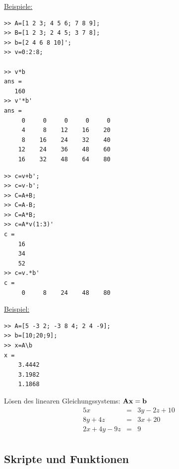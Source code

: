 \underline{Beispiele:}\medskip

\begin{minipage}[t]{0.5\textwidth}
\small\begin{verbatim}
>> A=[1 2 3; 4 5 6; 7 8 9];
>> B=[1 2 3; 2 4 5; 3 7 8];
>> b=[2 4 6 8 10]';
>> v=0:2:8;

>> v*b
ans =
   160
>> v'*b'
ans =
     0     0     0     0     0
     4     8    12    16    20
     8    16    24    32    40
    12    24    36    48    60
    16    32    48    64    80
\end{verbatim}
\end{minipage}
\hfill
\begin{minipage}[t]{0.42\textwidth}
\small\begin{verbatim}
>> c=v+b';
>> c=v-b';
>> C=A+B;
>> C=A-B;
>> C=A*B;
>> c=A*v(1:3)'
c =
    16
    34
    52
>> c=v.*b'
c =
     0     8    24    48    80
\end{verbatim}
\end{minipage}\bigskip

\underline{Beispiel:}\medskip

\begin{minipage}[t]{0.4\textwidth}
\small\begin{verbatim}
>> A=[5 -3 2; -3 8 4; 2 4 -9];
>> b=[10;20;9];
>> x=A\b
x =
    3.4442
    3.1982
    1.1868
\end{verbatim}
\end{minipage}
\hfill
\begin{minipage}[t]{0.59\textwidth}
Lösen des linearen Gleichungssystems: ${{\bm{\mathrm{A}}}}{{\bm{\mathrm{x}}}} = {{\bm{\mathrm{b}}}}$
\begin{eqnarray*}
5x &=& 3y-2z+10\\
8y+4z &=& 3x+20\\
2x+4y-9z &=& 9\\
\end{eqnarray*}
\end{minipage}



\clearpage
\subsection*{Skripte und Funktionen}

